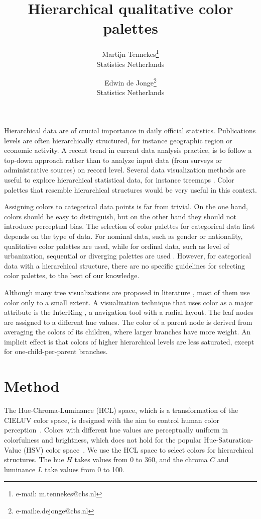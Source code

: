 \documentclass[review]{vgtc}                 %
\title{Hierarchical qualitative color palettes}
\author{Martijn Tennekes\thanks{e-mail: m.tennekes@cbs.nl}\\ %
        \scriptsize Statistics Netherlands %
\and Edwin de Jonge\thanks{e-mail:e.dejonge@cbs.nl}\\ %
     \scriptsize Statistics Netherlands}
\begin{document}

\maketitle

Hierarchical data are of crucial importance in daily official statistics. Publications levels are often hierarchically structured, for instance geographic region or economic activity. A recent trend in current data analysis practice, is to follow a top-down approach rather than to analyze input data (from surveys or administrative sources) on record level. Several data visualization methods are useful to explore hierarchical statistical data, for instance treemaps \cite{tennekes2011b}. Color palettes that resemble hierarchical structures would be very useful in this context.


Assigning colors to categorical data points is far from trivial. On the one hand, colors should be easy to distinguish, but on the other hand they should not introduce perceptual bias. The selection of color palettes for categorical data first depends on the type of data. For nominal data, such as gender or nationality, qualitative color palettes are used, while for ordinal data, such as level of urbanization, sequential or diverging palettes are used \cite{brewer03, zeileis2009}. However, for categorical data with a hierarchical structure, there are no specific guidelines for selecting color palettes, to the best of our knowledge.

Although many tree visualizations are proposed in literature \cite{schulz2011}, most of them use color only to a small extent. A visualization technique that uses color as a major attribute is the InterRing \cite{yang2002}, a navigation tool with a radial layout. The leaf nodes are assigned to a different hue values. The color of a parent node is derived from averaging the colors of its children, where larger branches have more weight. An implicit effect is that colors of higher hierarchical levels are less saturated, except for one-child-per-parent branches.


\section{Method}


The Hue-Chroma-Luminance (HCL) space, which is a transformation of the CIELUV color space, is designed with the aim to control human color perception~\cite{ihaka2003}.
Colors with different hue values are perceptually uniform in colorfulness and brightness, which does not hold for the popular Hue-Saturation-Value (HSV) color space~\cite{zeileis2009}. We use the HCL space to select colors for hierarchical structures. The hue $H$ takes values from 0 to 360, and the chroma $C$ and luminance $L$ take values from 0 to 100.
\end{document}

